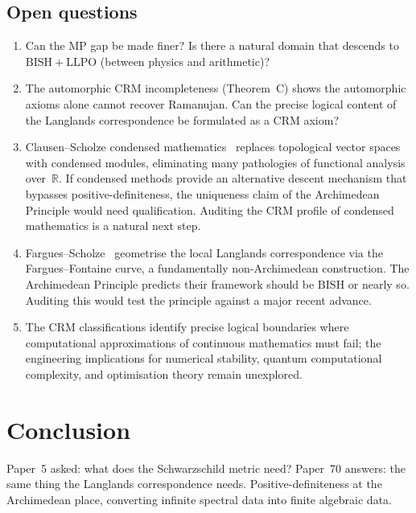\documentclass[11pt]{article}
\theoremstyle{definition}
\theoremstyle{remark}
\newcommand{\R}{\mathbb{R}}
\newcommand{\BISH}{\mathrm{BISH}}
\newcommand{\LLPO}{\mathrm{LLPO}}
\newcommand{\MP}{\mathrm{MP}}
\begin{document}
\subsection{Open questions}

\begin{enumerate}
\item Can the $\MP$ gap be made finer? Is there a natural domain that descends to $\BISH + \LLPO$ (between physics and arithmetic)?
\item The automorphic CRM incompleteness (Theorem~C) shows the automorphic axioms alone cannot recover Ramanujan. Can the precise logical content of the Langlands correspondence be formulated as a CRM axiom?
\item Clausen--Scholze condensed mathematics~\cite{ClausenScholze} replaces topological vector spaces with condensed modules, eliminating many pathologies of functional analysis over~$\R$. If condensed methods provide an alternative descent mechanism that bypasses positive-definiteness, the uniqueness claim of the Archimedean Principle would need qualification. Auditing the CRM profile of condensed mathematics is a natural next step.
\item Fargues--Scholze~\cite{FarguesScholze} geometrise the local Langlands correspondence via the Fargues--Fontaine curve, a fundamentally non-Archimedean construction. The Archimedean Principle predicts their framework should be $\BISH$ or nearly so. Auditing this would test the principle against a major recent advance.
\item The CRM classifications identify precise logical boundaries where computational approximations of continuous mathematics must fail; the engineering implications for numerical stability, quantum computational complexity, and optimisation theory remain unexplored.
\end{enumerate}

\section{Conclusion}
\label{sec:conclusion}

Paper~5 asked: what does the Schwarzschild metric need? Paper~70 answers: the same thing the Langlands correspondence needs. Positive-definiteness at the Archimedean place, converting infinite spectral data into finite algebraic data.
\end{document}
